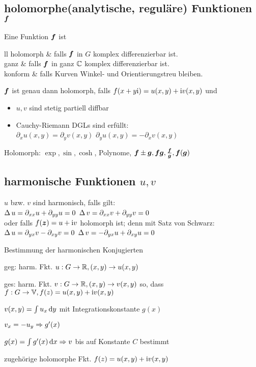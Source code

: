 \documentclass[german,color,6pt]{latex4ei/latex4ei_fs}
\begin{document}
\begin{sectionbox}
	\subsection{holomorphe(analytische, reguläre) Funktionen $\boldsymbol{f}$}
	Eine Funktion $\boldsymbol{f}$ ist \\ 
	\begin{tablebox}{ll}
		holomorph & falls $\boldsymbol{f}$ in $G$ komplex differenzierbar ist.\\
		ganz & falls $\boldsymbol{f}$ in ganz $\mathbb C$ komplex differenzierbar ist.\\
		konform & falls Kurven Winkel- und Orientierungstreu bleiben.\\

	\end{tablebox}
	$\boldsymbol{f}$ ist genau dann holomorph, falls $f(x+y\mathrm{i}) = u(x,y) + \mathrm{i} v(x,y)$ und
	\begin{itemize}\itemsep0pt
		\item $u,v$ sind stetig partiell diffbar
		\item Cauchy-Riemann DGLs sind erfüllt:\\
		$\partial_x u(x,y) = \partial_y v(x,y)$ \qquad $\partial_y u(x,y) = - \partial_x v(x,y)$\\
	\end{itemize}
	Holomorph: $\exp, \sin, \cosh$, Polynome, $\boldsymbol{f}\pm \boldsymbol{g}, \boldsymbol{f} \boldsymbol{g}, \frac{\boldsymbol{f}}{\boldsymbol{g}}, \boldsymbol{f}(\boldsymbol{g})$
\end{sectionbox}

\begin{sectionbox}
	\subsection{harmonische Funktionen $u,v$}
	$u$ bzw. $v$ sind harmonisch, falls gilt:\\
	$\operatorname{\Delta} u = \partial_{xx} u + \partial_{yy} u = 0$ \qquad\quad $\operatorname{\Delta} v = \partial_{xx} v + \partial_{yy} v = 0$\\[0.5em]
	oder falls $f(\boldsymbol{z}) = u + \mathrm{i} v$ holomorph ist; denn mit Satz von Schwarz:\\
	$\operatorname{\Delta} u = \partial_{yx} v - \partial_{xy} v = 0$ \qquad\quad $\operatorname{\Delta} v = - \partial_{yx} u + \partial_{xy} u = 0$
	\begin{cookbox}{Bestimmung der harmonischen Konjugierten}
			\item geg: harm. Fkt. $u: G \rightarrow \mathbb R, (x,y) \rightarrow u(x,y)$
			\item ges: harm. Fkt. $v: G \rightarrow \mathbb R, (x,y) \rightarrow v(x,y)$
			so, dass $f: G \rightarrow \mathbb V, f(z) = u(x,y) + \mathrm{i} v (x,y)$
			\item $v(x,y) = \int u_x \diff y$ mit Integrationskonstante $g(x)$
			\item $v_x = -u_y \Rightarrow g'(x)$
			\item $g(x) = \int g'(x) \diff x \Ra v$ bis auf Konstante $C$ bestimmt
			\item zugehörige holomorphe Fkt.
			$f (z) = u (x,y) + \mathrm{i} v(x,y)$
	\end{cookbox}
\end{sectionbox}
\end{document}
